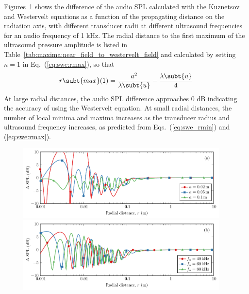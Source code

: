 Figures~\ref{fig:kuznetsov:diff_ultra_freq} shows the difference of the audio SPL calculated with the Kuznetsov and Westervelt equations as a function of the propagating distance on the radiation axis, with different transducer radii at different ultrasound frequencies for an audio frequency of 1 kHz. 
The radial distance to the first maximum of the ultrasound pressure amplitude is listed in Table~\ref{tab:maxima:near_field_to_westervelt_field} and calculated by setting $n = 1$ in Eq.~(\ref{eq:swe:rmax}), so that
\begin{equation}
    r\subt{max}(1)
    = 
    \frac{a^2}{\lambda\subt{u}}
    -
    \frac{\lambda\subt{u}}{4}
\end{equation} 
At large radial distances, the audio SPL difference approaches 0 dB indicating the accuracy of using the Westervelt equation. At small radial distances, the number of local minima and maxima increases as the transducer radius and ultrasound frequency increases, as predicted from Eqs.~(\ref{eq:swe_rmin}) and (\ref{eq:swe:rmax}).
\begin{figure}[!htb]
    \centering
    \includegraphics[width = 0.95\textwidth]{Figures/pending/compare_WD_radiusVary_ultra40e3_audio1000_200725A4.pdf}
    \includegraphics[width = 0.95\textwidth]{Figures/pending/compare_nearfield_radius0p05_ultraVary_audio1000_200725C.pdf}
    \caption{}
    \label{fig:kuznetsov:diff_ultra_freq}
\end{figure}

